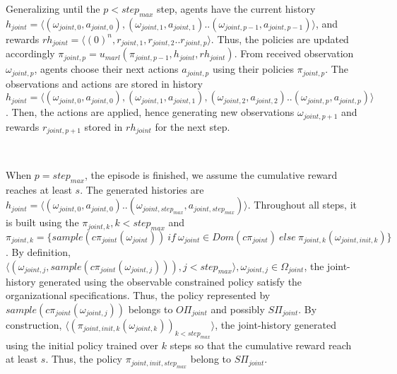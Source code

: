 \begin{proofoutline}

    Generalizing until the $p < step_{max}$ step, agents have the current history $h_{joint} = \langle (\omega_{joint,0}, \allowbreak a_{joint,0}), (\omega_{joint,1}, a_{joint,1})..(\omega_{joint,p-1}, a_{joint,p-1}) \rangle$, and rewards $rh_{joint} = \langle (0)^n, r_{joint,1}, r_{joint,2}..r_{joint,p} \rangle$. Thus, the policies are updated accordingly $\pi_{joint,p} = u_{marl}(\pi_{joint,p-1},h_{joint},rh_{joint})$. From received observation $\omega_{joint,p}$, agents choose their next actions $a_{joint,p}$ using their policies $\pi_{joint,p}$. The observations and actions are stored in history $h_{joint} \allowbreak = \allowbreak \langle \allowbreak (\omega_{joint,0},a_{joint,0}), \allowbreak (\omega_{joint,1},a_{joint,1}), (\omega_{joint,2},a_{joint,2})..(\omega_{joint,p},a_{joint,p}) \rangle$. Then, the actions are applied, hence generating new observations $\omega_{joint,p+1}$ and rewards $r_{joint,p+1}$ stored in $rh_{joint}$ for the next step.

    \

    When $p = step_{max}$, the episode is finished, we assume the cumulative reward reaches at least $s$. The generated histories are $h_{joint} = \langle (\omega_{joint,0}, \allowbreak a_{joint,0}) .. \allowbreak (\omega_{joint,step_{max}},a_{joint,step_{max}}) \rangle$. Throughout all steps, it is built using the $\pi_{joint,k}, \allowbreak k < step_{max}$ and $\pi_{joint,k} \allowbreak = \allowbreak \{sample(c\pi_{joint}(\omega_{joint})) \allowbreak \ \allowbreak if \allowbreak \ \allowbreak \omega_{joint} \in Dom(c\pi_{joint}) \allowbreak \ \allowbreak else \allowbreak \ \allowbreak \pi_{joint,k}(\omega_{joint,init,k})\}$.
    By definition, $\langle (\omega_{joint,j}, \allowbreak sample(c\pi_{joint}(\omega_{joint,j}))), \allowbreak j < step_{max} \rangle, \allowbreak \omega_{joint,j} \allowbreak \in \Omega_{joint}$, the joint-history generated using the observable constrained policy satisfy the organizational specifications. Thus, the policy represented by $sample(c\pi_{joint}(\omega_{joint,j}))$ belongs to $O\Pi_{joint}$ and possibly $S\Pi_{joint}$.
    By construction, $\langle (\pi_{joint,init,k}(\omega_{joint,k}))_{k < step_{max}} \rangle$, the joint-history generated using the initial policy trained over $k$ steps so that the cumulative reward reach at least $s$. Thus, the policy $\pi_{joint,init,step_{max}}$ belong to $S\Pi_{joint}$.


\end{proofoutline}
